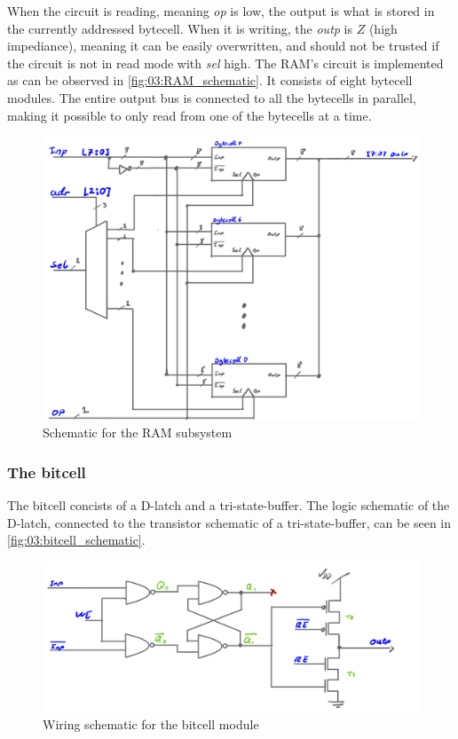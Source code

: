 When the circuit is reading, meaning \textit{op} is low, the output is what is stored in the currently addressed bytecell. When it is writing, the \textit{outp} is $Z$ (high impediance), meaning it can be easily overwritten, and should not be trusted if the circuit is not in read mode with \textit{sel} high. The RAM's circuit is implemented as can be observed in \autoref{fig:03:RAM_schematic}. It consists of eight bytecell modules. The entire output bus is connected to all the bytecells in parallel, making it possible to only read from one of the bytecells at a time.

\begin{figure}[H]
    \centering
    \includegraphics[width=0.8\linewidth]{LaTeX_2/Figures/ram_schematic.png}
    \caption{Schematic for the RAM subsystem}
    \label{fig:03:RAM_schematic}
\end{figure}


\subsubsection{The bitcell}
The bitcell concists of a D-latch and a tri-state-buffer. The logic schematic of the D-latch, connected to the transistor schematic of a tri-state-buffer, can be seen in \autoref{fig:03:bitcell_schematic}.

\begin{figure}[H]
    \centering
    \includegraphics[width=0.8\linewidth]{LaTeX_2/Figures/bitcell_schematic.png}
    \caption{Wiring schematic for the bitcell module}
    \label{fig:03:bitcell_schematic}
\end{figure}

